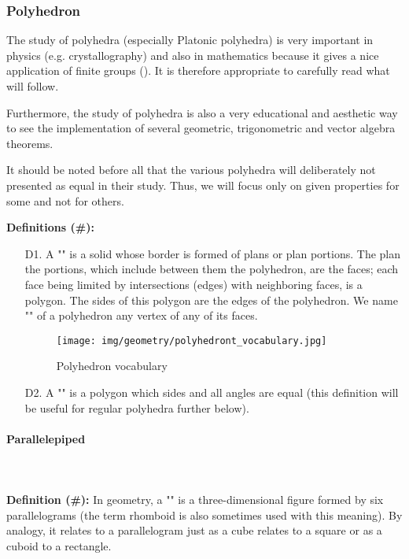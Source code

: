 {	\pagebreak
	\subsubsection{Polyhedron}
	The study of polyhedra (especially Platonic polyhedra) is very important in physics (e.g. crystallography) and also in mathematics because it gives a nice application of finite groups (). It is therefore appropriate to carefully read what will follow.
	
	Furthermore, the study of polyhedra is also a very educational and aesthetic way to see the implementation of several geometric, trigonometric and vector algebra theorems.
	
	It should be noted before all that the various polyhedra will deliberately not presented as equal in their study. Thus, we will focus only on given properties for some and not for others.
	
	\textbf{Definitions (\#\mydef):}
	\begin{enumerate}
		\item[D1.] A "" is a solid whose border is formed of plans or plan portions. The plan the portions, which include between them the polyhedron, are the faces; each face being limited by intersections (edges) with neighboring faces, is a polygon. The sides of this polygon are the edges of the polyhedron. We name "" of a polyhedron any vertex of any of its faces.
		\begin{figure}[H]
			\centering
			\texttt{[image: img/geometry/polyhedront\_vocabulary.jpg]}
			\caption{Polyhedron vocabulary}
		\end{figure}
		
		\item[D2.] A "" is a polygon which sides and all angles are equal (this definition will be useful for regular polyhedra further below).
	\end{enumerate}
	
	\paragraph{Parallelepiped}\mbox{}\\\\
	\textbf{Definition (\#\mydef):} In geometry, a "" is a three-dimensional figure formed by six parallelograms (the term rhomboid is also sometimes used with this meaning). By analogy, it relates to a parallelogram just as a cube relates to a square or as a cuboid to a rectangle.
	
}
